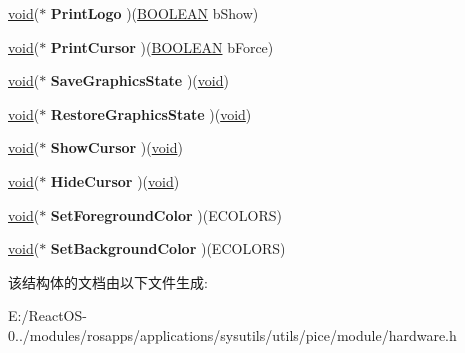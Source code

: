 \begin{DoxyCompactItemize}
\item 
\mbox{\label{struct___o_u_t_p_u_t___h_a_n_d_l_e_r_s_a9af56852b5dac127fb1165139612c5f2}} 
\hyperlink{interfacevoid}{void}($\ast$ {\bfseries Print\+Logo} )(\hyperlink{_processor_bind_8h_a112e3146cb38b6ee95e64d85842e380a}{B\+O\+O\+L\+E\+AN} b\+Show)
\item 
\mbox{\label{struct___o_u_t_p_u_t___h_a_n_d_l_e_r_s_a448e069e6c17a12fa80efc5737ba26f1}} 
\hyperlink{interfacevoid}{void}($\ast$ {\bfseries Print\+Cursor} )(\hyperlink{_processor_bind_8h_a112e3146cb38b6ee95e64d85842e380a}{B\+O\+O\+L\+E\+AN} b\+Force)
\item 
\mbox{\label{struct___o_u_t_p_u_t___h_a_n_d_l_e_r_s_ad1562cc0ed4c8df5d8545da28dde9376}} 
\hyperlink{interfacevoid}{void}($\ast$ {\bfseries Save\+Graphics\+State} )(\hyperlink{interfacevoid}{void})
\item 
\mbox{\label{struct___o_u_t_p_u_t___h_a_n_d_l_e_r_s_aca2577c10de64182109e3b66f1c226f8}} 
\hyperlink{interfacevoid}{void}($\ast$ {\bfseries Restore\+Graphics\+State} )(\hyperlink{interfacevoid}{void})
\item 
\mbox{\label{struct___o_u_t_p_u_t___h_a_n_d_l_e_r_s_a03146dc4845e0c8a3c37383dc1eab4cd}} 
\hyperlink{interfacevoid}{void}($\ast$ {\bfseries Show\+Cursor} )(\hyperlink{interfacevoid}{void})
\item 
\mbox{\label{struct___o_u_t_p_u_t___h_a_n_d_l_e_r_s_ac182c348896ce00125fe8a4d01e7fbaf}} 
\hyperlink{interfacevoid}{void}($\ast$ {\bfseries Hide\+Cursor} )(\hyperlink{interfacevoid}{void})
\item 
\mbox{\label{struct___o_u_t_p_u_t___h_a_n_d_l_e_r_s_ac2da52f74630a6d32df159e59954a287}} 
\hyperlink{interfacevoid}{void}($\ast$ {\bfseries Set\+Foreground\+Color} )(E\+C\+O\+L\+O\+RS)
\item 
\mbox{\label{struct___o_u_t_p_u_t___h_a_n_d_l_e_r_s_ab1fdad3051b9ea805c794bd102e46918}} 
\hyperlink{interfacevoid}{void}($\ast$ {\bfseries Set\+Background\+Color} )(E\+C\+O\+L\+O\+RS)
\end{DoxyCompactItemize}


该结构体的文档由以下文件生成\+:\begin{DoxyCompactItemize}
\item 
E\+:/\+React\+O\+S-\/0../modules/rosapps/applications/sysutils/utils/pice/module/hardware.\+h\end{DoxyCompactItemize}

